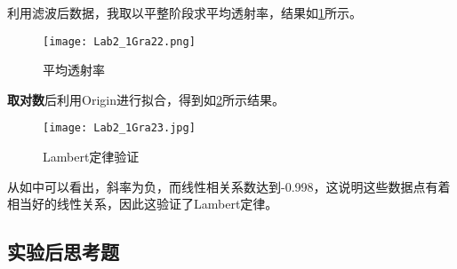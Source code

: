 \documentclass[dvipsnames, svgnames,a4paper,11pt]{article}
\begin{document}
	利用滤波后数据，我取以平整阶段求平均透射率，结果如\cref{fig:fig22}所示。
	
	\begin{figure}[htbp]
		\centering
		\texttt{[image: Lab2\_1Gra22.png]}
		\caption{平均透射率}
		\label{fig:fig22}
	\end{figure}
	
	\textbf{取对数}后利用Origin进行拟合，得到如\cref{fig:fig23}所示结果。
	
	\begin{figure}[htbp]
		\centering
		\texttt{[image: Lab2\_1Gra23.jpg]}
		\caption{Lambert定律验证}
		\label{fig:fig23}
	\end{figure}
	
	从如中可以看出，斜率为负，而线性相关系数达到-0.998，这说明这些数据点有着相当好的线性关系，因此这验证了Lambert定律。
	
	
	\subsection{实验后思考题}
	
\end{document}
